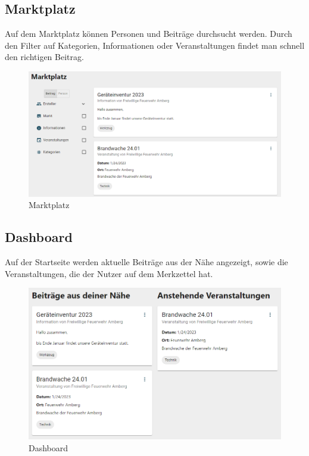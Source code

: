 \clearpage
\subsection{Marktplatz}
\label{sec:marketplace}

Auf dem Marktplatz können Personen und Beiträge durchsucht werden.
Durch den Filter auf Kategorien, Informationen oder Veranstaltungen findet man schnell den richtigen Beitrag.

\begin{figure}[ht!]
    \begin{centering}
        \includegraphics[width=1\textwidth]{figures/implementation/marktplatz.png}
        \caption{Marktplatz}
        \label{fig:marktplatz}
    \end{centering}
\end{figure}


\subsection{Dashboard}
\label{sec:dashboard}

Auf der Startseite werden aktuelle Beiträge aus der Nähe angezeigt, sowie die Veranstaltungen, die der Nutzer auf dem Merkzettel hat.

\begin{figure}[ht!]
    \begin{centering}
        \includegraphics[width=.8\textwidth]{figures/implementation/dashboard.png}
        \caption{Dashboard}
        \label{fig:dashboard}
    \end{centering}
\end{figure}


